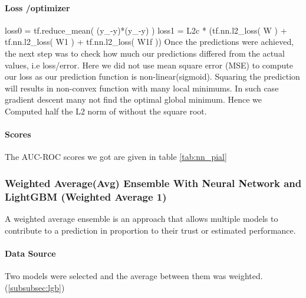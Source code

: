 \documentclass[sigconf, nonacm]{acmart}
\begin{document}
\paragraph{Loss /optimizer}

loss0 = tf.reduce\_mean( (y\_-y)*(y\_-y) )\newline 
loss1 = L2c * (tf.nn.l2\_loss( W ) + tf.nn.l2\_loss( W1 ) + tf.nn.l2\_loss( W1f ))
Once the predictions were achieved, the next step was to check how much our predictions differed from the actual values, i.e loss/error. Here we did not use mean square error (MSE) to compute our loss as our prediction function is non-linear(sigmoid). Squaring the prediction will results in non-convex function with many local minimums. In such case gradient descent many not find the optimal global minimum. Hence we  Computed half the L2 norm of  without the square root.

\paragraph{Scores}
The AUC-ROC scores we got are given in table \ref{tab:nn_pial}
 
     

	      	      	          
	 
\subsubsection{Weighted Average(Avg) Ensemble With Neural Network and LightGBM (Weighted Average 1)} \label{subsubsec:wa_1}

A weighted average ensemble is an approach that allows multiple models to contribute to a prediction in proportion to their trust or estimated performance.
\paragraph{Data Source}
Two models were selected and the average between them was weighted. \cite{home_credit_default_risk_approaching_with_nn} (\ref{subsubsec:lgb})
\end{document}

